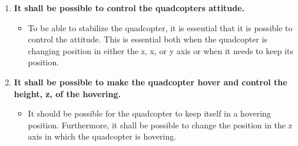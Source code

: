 \begin{enumerate}[label=\textbf{\arabic*})]
\item \textbf{It shall be possible to control the quadcopters attitude.}
\begin{itemize}
\item[] To be able to stabilize the quadcopter, it is essential that it is possible to control the attitude. This is essential both when the quadcopter is changing position in either the z, x, or y axis or when it needs to keep its position.
\end{itemize}

\item \textbf{It shall be possible to make the quadcopter hover and control the height, z, of the hovering.}
\begin{itemize}
\item[] It should be possible for the quadcopter to keep itself in a hovering position. Furthermore, it shall be possible to change the position in the z axis in which the quadcopter is hovering.
\end{itemize}







\end{enumerate}
